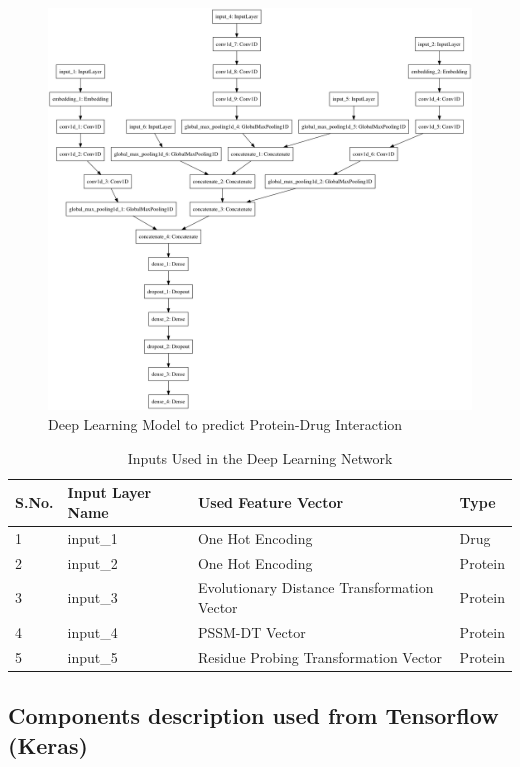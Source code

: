   \begin{figure}[ht]
  \centering
  \includegraphics[width=1\linewidth]{mainmatter/3-Methodology/images/build_combined_categorical_tensor_contact_new.png}
  \caption{Deep Learning Model to predict Protein-Drug Interaction}
  \label{fig:dlm}
  \end{figure}
  \begin{table}[ht]\centering
    \caption{Inputs Used in the Deep Learning Network} 
    \begin{tabular}{|l|l|l|l|}
      \hline 
      S.No. & Input Layer Name & Used Feature Vector & Type \\ \hline
      1 & input\_1 & One Hot Encoding & Drug \\ \hline
      2 & input\_2 & One Hot Encoding & Protein \\ \hline
      3 & input\_3 & Evolutionary Distance Transformation Vector& Protein \\ \hline
      4 & input\_4 & PSSM-DT Vector & Protein \\ \hline
      5 & input\_5 & Residue Probing Transformation Vector & Protein \\   \hline 
    \end{tabular} 
    
    \label{table:inputs}
  \end{table}
  
  \subsection{Components description used from Tensorflow (Keras)}
